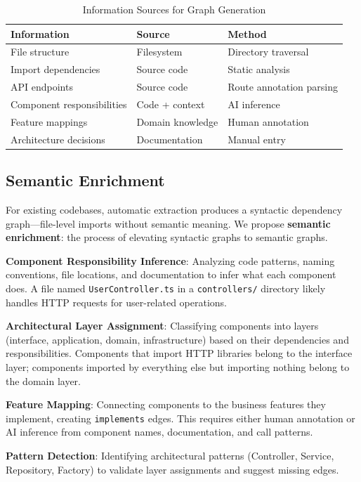 \documentclass[11pt,a4paper]{article}
\begin{document}
\begin{table}[h]
\centering
\caption{Information Sources for Graph Generation}
\begin{tabular}{@{}lll@{}}
\toprule
\textbf{Information} & \textbf{Source} & \textbf{Method} \\
\midrule
File structure & Filesystem & Directory traversal \\
Import dependencies & Source code & Static analysis \\
API endpoints & Source code & Route annotation parsing \\
Component responsibilities & Code + context & AI inference \\
Feature mappings & Domain knowledge & Human annotation \\
Architecture decisions & Documentation & Manual entry \\
\bottomrule
\end{tabular}
\end{table}

\subsection{Semantic Enrichment}

For existing codebases, automatic extraction produces a syntactic dependency graph---file-level imports without semantic meaning. We propose \textbf{semantic enrichment}: the process of elevating syntactic graphs to semantic graphs.

\textbf{Component Responsibility Inference}: Analyzing code patterns, naming conventions, file locations, and documentation to infer what each component does. A file named \texttt{UserController.ts} in a \texttt{controllers/} directory likely handles HTTP requests for user-related operations.

\textbf{Architectural Layer Assignment}: Classifying components into layers (interface, application, domain, infrastructure) based on their dependencies and responsibilities. Components that import HTTP libraries belong to the interface layer; components imported by everything else but importing nothing belong to the domain layer.

\textbf{Feature Mapping}: Connecting components to the business features they implement, creating \texttt{implements} edges. This requires either human annotation or AI inference from component names, documentation, and call patterns.

\textbf{Pattern Detection}: Identifying architectural patterns (Controller, Service, Repository, Factory) to validate layer assignments and suggest missing edges.
\end{document}
